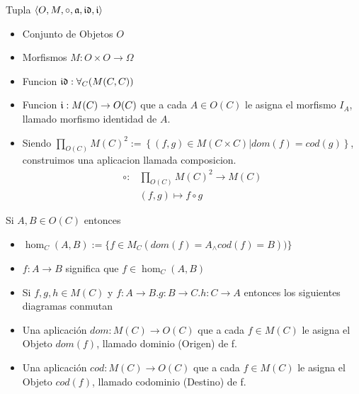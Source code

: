 \begin{defn}[Categoria]
\end{defn}
Tupla $\langle O,M,\circ,\mathfrak{a},\mathfrak{id},\mathfrak{i} \rangle$ 
\begin{itemize}
\item Conjunto de Objetos $O$
\item Morfismos $M: O \times O \to \Omega$
\item Funcion $\mathfrak{id} : \forall_C (M(C,C))$
\item Funcion $\mathfrak{i} : M(C) \to O(C)$ que a cada $A \in O(C)$ le
asigna el morfismo $I_A$, llamado morfismo identidad de $A$.
\item Siendo $\displaystyle \prod_{O(C)} M(C)^2 := \left\lbrace (f, g) \in M(C \times C) | dom(f)=cod(g) \right\rbrace$, construimos una aplicacion llamada composicion.
\begin{align*}
  \displaystyle \circ: & \prod_{O(C)} M(C)^2  \to M(C) \\
					   & (f,g) 					  \mapsto f \circ g
\end{align*}
\end{itemize}

\begin{note}
Si $A,B \in O(C)$ entonces 

\end{note}
\begin{itemize}
\item $\hom_{C}(A,B):= \{ f \in M_{C}(dom(f)=A _{\wedge} cod(f)=B)) \}$
\item $f: A \to B$ significa que $f \in \hom_{C}(A,B)$
\item Si $f,g,h \in M(C)$ y $f:A \to B.g:B \to C.h:C \to A$ entonces los siguientes diagramas conmutan

\begin{figure}
\centerline{
		}
\end{figure}
	
\end{itemize}

\begin{defn}
\end{defn}
\begin{itemize}
\item Una aplicación $dom : M(C) \to O(C)$ que a cada $f \in M(C)$ le
asigna el Objeto $dom(f)$, llamado dominio (Origen) de f.
\item Una aplicación $cod : M(C) \to O(C)$ que a cada $f \in M(C)$ le
asigna el Objeto $cod(f)$, llamado codominio (Destino) de f.
\end{itemize}

